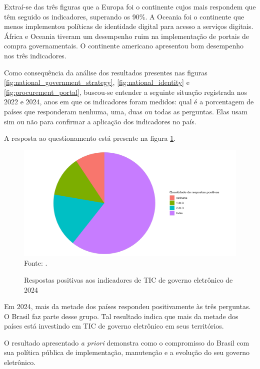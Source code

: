 Extraí-se das três figuras que a Europa foi o continente cujos mais respondem que têm seguido os indicadores, superando os 90\%. A Oceania foi o continente que menos implementou políticas de identidade digital para acesso a serviços digitais. África e Oceania tiveram um desempenho ruim na implementação de portais de compra governamentais. O continente americano apresentou bom desempenho nos três indicadores.

Como consequência da análise dos resultados presentes nas figuras \ref{fig:national_government_strategy}, \ref{fig:national_identity} e \ref{fig:procurement_portal}, buscou-se entender a seguinte situação registrada nos 2022 e 2024, anos em que os indicadores foram medidos: qual é a porcentagem de países que responderam nenhuma, uma, duas ou todas as perguntas. Elas usam sim ou não para confirmar a aplicação dos indicadores no país.

A resposta ao questionamento está presente na figura \ref{fig:ticegov_soma_respostas_positivas}.

\begin{figure}[H]
	\centering
	\caption{Respostas positivas aos indicadores de TIC de governo eletrônico de 2024}
	\includegraphics[width=1\linewidth]{figuras/ticegov_soma_respostas_positivas}
	\label{fig:ticegov_soma_respostas_positivas}
	\footnotesize{Fonte: \cite{ONU_ICT_in_government_indicators}.}
\end{figure}

Em 2024, mais da metade dos países respondeu positivamente às três perguntas. O Brasil faz parte desse grupo. Tal resultado indica que mais da metade dos países está investindo em TIC de governo eletrônico em seus territórios.

O resultado apresentado \textit{a priori} demonstra como o compromisso do Brasil com sua política pública de implementação, manutenção e a evolução do seu governo eletrônico.

